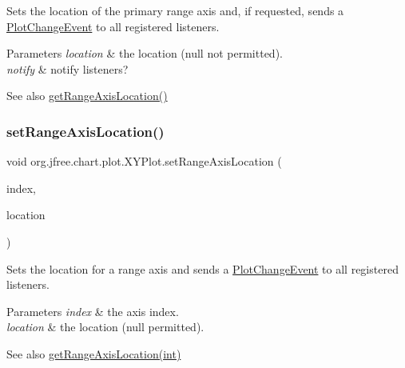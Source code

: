 Sets the location of the primary range axis and, if requested, sends a \mbox{\hyperlink{}{Plot\+Change\+Event}} to all registered listeners.


\begin{DoxyParams}{Parameters}
{\em location} & the location ({\ttfamily null} not permitted). \\
\hline
{\em notify} & notify listeners?\\
\hline
\end{DoxyParams}
\begin{DoxySeeAlso}{See also}
\mbox{\hyperlink{classorg_1_1jfree_1_1chart_1_1plot_1_1_x_y_plot_a6fb19e12902c04095a10b90a2c22dc05}{get\+Range\+Axis\+Location()}} 
\end{DoxySeeAlso}
\mbox{\label{classorg_1_1jfree_1_1chart_1_1plot_1_1_x_y_plot_a7421dcb0efb6a256b010db43c4260d88}} 
\subsubsection{\texorpdfstring{set\+Range\+Axis\+Location()}{setRangeAxisLocation()}\hspace{0.1cm}{\footnotesize\ttfamily [3/4]}}
{\footnotesize\ttfamily void org.\+jfree.\+chart.\+plot.\+X\+Y\+Plot.\+set\+Range\+Axis\+Location (\begin{DoxyParamCaption}\item[{int}]{index,  }\item[{\mbox{\hyperlink{classorg_1_1jfree_1_1chart_1_1axis_1_1_axis_location}{Axis\+Location}}}]{location }\end{DoxyParamCaption})}

Sets the location for a range axis and sends a \mbox{\hyperlink{}{Plot\+Change\+Event}} to all registered listeners.


\begin{DoxyParams}{Parameters}
{\em index} & the axis index. \\
\hline
{\em location} & the location ({\ttfamily null} permitted).\\
\hline
\end{DoxyParams}
\begin{DoxySeeAlso}{See also}
\mbox{\hyperlink{classorg_1_1jfree_1_1chart_1_1plot_1_1_x_y_plot_a8e34e93de05b6fff6f0af0bef7b285d7}{get\+Range\+Axis\+Location(int)}} 
\end{DoxySeeAlso}
\mbox{\label{classorg_1_1jfree_1_1chart_1_1plot_1_1_x_y_plot_a8bb9fb9268c90667ea80f87efdce9278}} 
